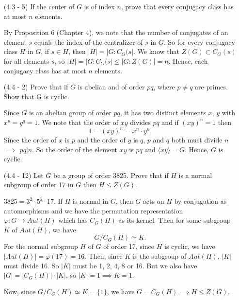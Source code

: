\documentclass[12pt]{article}
\begin{document}
\begin{enumerate}
\item[(4.3 - 5)] If the center of $G$ is of index $n$,
    prove that every conjugacy class has at most $n$
    elements.
\begin{mybox}

    By Proposition 6 (Chapter 4), we note that
    the number of conjugates of an element $s$
    equals the index of the centralizer of $s$ in
    $G$. So for every conjugacy class $H$ in $G$,
    if $s\in H$, then $|H|=|G:C_G(s|$.
    We know that $Z(G)\subset C_G(s)$ for all elements
    $s$, so $|H|=|G:C_G(s|\leq|G:Z(G)|=n$.
    Hence, each conjugacy class has at most $n$
    elements.
\end{mybox}

\item[(4.4 - 2)] Prove that if $G$ is abelian and of order
    $pq$, where $p\neq q$ are primes. Show that G is cyclic.
\begin{mybox}
    
    Since $G$ is an abelian group of
    order $pq$, it has two distinct elements $x$, $y$
    with $x^p=y^q=1$. We note that the order of
    $xy$ divides $pq$ and if $(xy)^n=1$ then
    $$1=(xy)^n=x^n\cdot y^n.$$
    Since the order of $x$ is $p$ and the order of
    $y$ is $q$, $p$ and $q$ both must divide $n$
    $\implies$ $pq|n$. So the order of the element
    $xy$ is $pq$ and $\langle xy\rangle=G$. Hence,
    $G$ is cyclic.

\end{mybox}

\item[(4.4 - 12)] Let $G$ be a group of order 3825.
    Prove that if $H$ is a normal subgroup of order
    17 in $G$ then $H\leq Z(G)$.
\begin{mybox}

    $3825=3^2\cdot 5^2\cdot 17$. If $H$ is normal in
    $G$, then $G$ acts on $H$ by conjugation as
    automorphisms and we
    have the permutation representation
    $\varphi:G\to Aut(H)$ which has $C_G(H)$ as its
    kernel.
    Then for some subgroup $K$ of $Aut(H)$,
    we have $$G/C_G(H)\simeq K.$$
    For the normal subgroup $H$ of $G$ of order 17,
    since $H$ is cyclic, we have
    $|Aut(H)|=\varphi(17)=16$. Then, since $K$ is
    the subgroup of $Aut(H)$, $|K|$ must divide
    16. So $|K|$ must be 1, 2, 4, 8 or 16.
    But we also have
    $|G|=|C_G(H)|\cdot|K|$, so $|K|=1\implies K=1$.

    \vspace*{2mm}
    Now, since $G/C_G(H)\simeq K=\{1\}$, we have
    $G=C_G(H)\implies H\leq Z(G)$. 
\end{mybox}


\end{enumerate}
\end{document}
